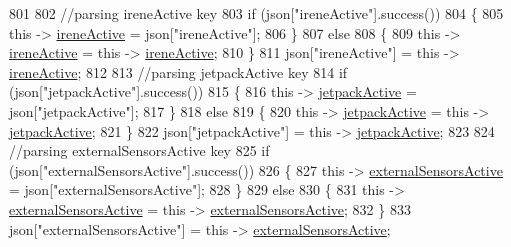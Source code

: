 \begin{DoxyCode}
801             
802             \textcolor{comment}{//parsing ireneActive key           }
803             \textcolor{keywordflow}{if} (json[\textcolor{stringliteral}{"ireneActive"}].success())
804             \{
805                 \textcolor{keyword}{this} -> \hyperlink{class_cool_board_a9c3f7ac625481ee2ae802a25d97a4ae0}{ireneActive} = json[\textcolor{stringliteral}{"ireneActive"}];
806             \}
807             \textcolor{keywordflow}{else}
808             \{
809                 \textcolor{keyword}{this} -> \hyperlink{class_cool_board_a9c3f7ac625481ee2ae802a25d97a4ae0}{ireneActive} = \textcolor{keyword}{this} -> \hyperlink{class_cool_board_a9c3f7ac625481ee2ae802a25d97a4ae0}{ireneActive};
810             \}
811             json[\textcolor{stringliteral}{"ireneActive"}] = \textcolor{keyword}{this} -> \hyperlink{class_cool_board_a9c3f7ac625481ee2ae802a25d97a4ae0}{ireneActive};
812             
813             \textcolor{comment}{//parsing jetpackActive key}
814             \textcolor{keywordflow}{if} (json[\textcolor{stringliteral}{"jetpackActive"}].success())
815             \{
816                 \textcolor{keyword}{this} -> \hyperlink{class_cool_board_a9be03a913d26e558328935ca3b59a75e}{jetpackActive} = json[\textcolor{stringliteral}{"jetpackActive"}];
817             \}
818             \textcolor{keywordflow}{else}
819             \{
820                 \textcolor{keyword}{this} -> \hyperlink{class_cool_board_a9be03a913d26e558328935ca3b59a75e}{jetpackActive} = \textcolor{keyword}{this} -> \hyperlink{class_cool_board_a9be03a913d26e558328935ca3b59a75e}{jetpackActive};
821             \}
822             json[\textcolor{stringliteral}{"jetpackActive"}] = \textcolor{keyword}{this} -> \hyperlink{class_cool_board_a9be03a913d26e558328935ca3b59a75e}{jetpackActive};
823 
824             \textcolor{comment}{//parsing externalSensorsActive key}
825             \textcolor{keywordflow}{if} (json[\textcolor{stringliteral}{"externalSensorsActive"}].success())
826             \{
827                 \textcolor{keyword}{this} -> \hyperlink{class_cool_board_a638b00b76aeb819ecfd4c10b8cdd7bb7}{externalSensorsActive} = json[\textcolor{stringliteral}{"externalSensorsActive"}];
828             \}
829             \textcolor{keywordflow}{else}
830             \{
831                 \textcolor{keyword}{this} -> \hyperlink{class_cool_board_a638b00b76aeb819ecfd4c10b8cdd7bb7}{externalSensorsActive} = \textcolor{keyword}{this} -> 
      \hyperlink{class_cool_board_a638b00b76aeb819ecfd4c10b8cdd7bb7}{externalSensorsActive};
832             \}
833             json[\textcolor{stringliteral}{"externalSensorsActive"}] = \textcolor{keyword}{this} -> \hyperlink{class_cool_board_a638b00b76aeb819ecfd4c10b8cdd7bb7}{externalSensorsActive};

\end{DoxyCode}

